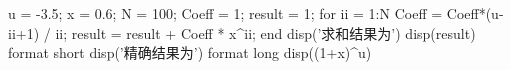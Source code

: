 u = -3.5; %
x = 0.6; %
N = 100; %
Coeff = 1; %
result = 1; %
for ii = 1:N
    Coeff = Coeff*(u-ii+1) / ii; 
    result = result + Coeff * x^ii; 
end
disp('求和结果为')
disp(result)
format short %
disp('精确结果为')
format long %
disp((1+x)^u)
